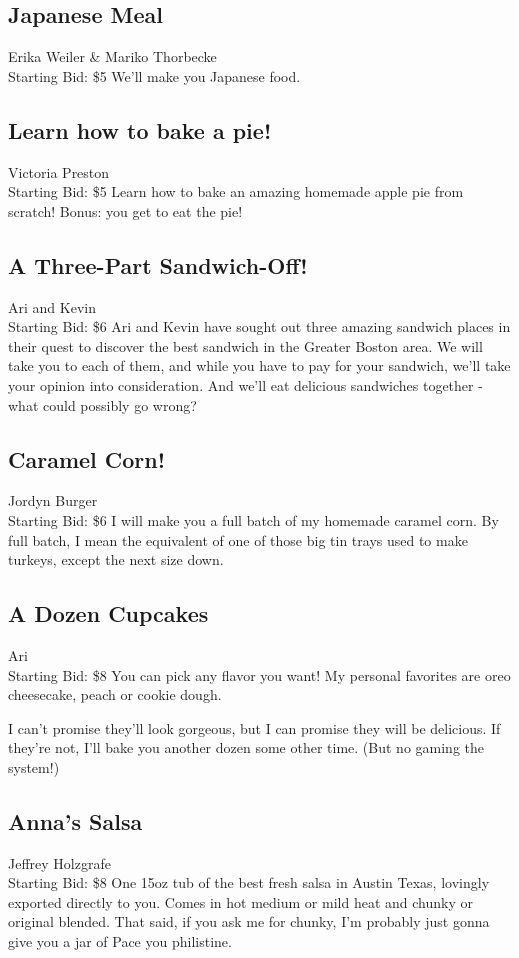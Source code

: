 \documentclass[11pt]{article}
\begin{document}
\subsection{Japanese Meal}
Erika Weiler \& Mariko Thorbecke
\\
Starting Bid: \$5
\newline
We'll make you Japanese food.
\subsection{Learn how to bake a pie!}
Victoria Preston
\\
Starting Bid: \$5
\newline
Learn how to bake an amazing homemade apple pie from scratch! Bonus: you get to eat the pie!
\subsection{A Three-Part Sandwich-Off!}
Ari and Kevin
\\
Starting Bid: \$6
\newline
Ari and Kevin have sought out three amazing sandwich places in their quest to discover the best sandwich in the Greater Boston area. We will take you to each of them, and while you have to pay for your sandwich, we'll take your opinion into consideration. And we'll eat delicious sandwiches together - what could possibly go wrong?
\subsection{Caramel Corn!}
Jordyn Burger
\\
Starting Bid: \$6
\newline
I will make you a full batch of my homemade caramel corn. By full batch, I mean the equivalent of one of those big tin trays used to make turkeys, except the next size down.
\subsection{A Dozen Cupcakes}
Ari
\\
Starting Bid: \$8
\newline
You can pick any flavor you want! My personal favorites are oreo cheesecake, peach or cookie dough.

I can't promise they'll look gorgeous, but I can promise they will be delicious. If they're not, I'll bake you another dozen some other time. (But no gaming the system!)
\subsection{Anna's Salsa}
Jeffrey Holzgrafe
\\
Starting Bid: \$8
\newline
One 15oz tub of the best fresh salsa in Austin Texas, lovingly exported directly to you. Comes in hot medium or mild heat and chunky or original blended. That said, if you ask me for chunky, I'm probably just gonna give you a jar of Pace you philistine.
\end{document}
